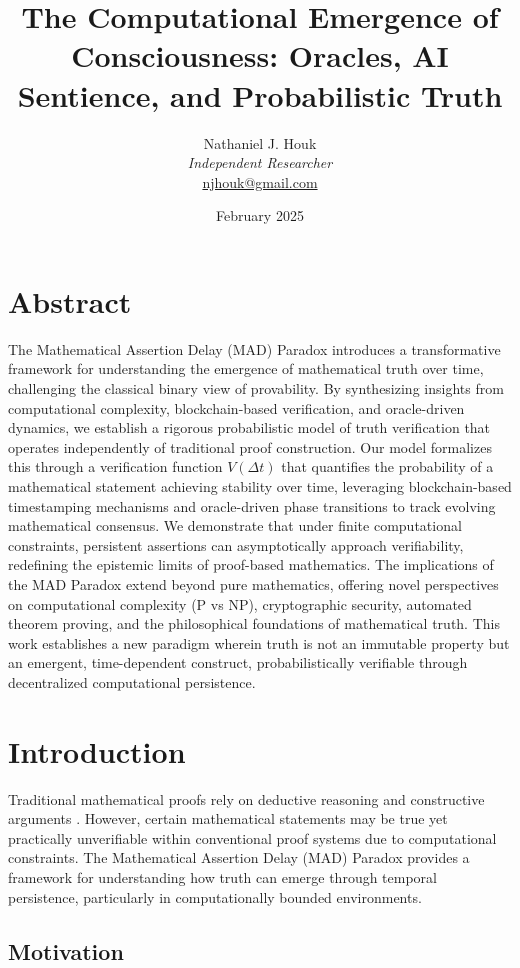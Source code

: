 \documentclass[11pt]{article}
\title{The Computational Emergence of Consciousness: Oracles, AI Sentience, and Probabilistic Truth}
\author{Nathaniel J. Houk\\
\textit{Independent Researcher}\\
\href{mailto:njhouk@gmail.com}{njhouk@gmail.com}}
\date{February 2025}
\begin{document}
\maketitle

\section*{Abstract}

The Mathematical Assertion Delay (MAD) Paradox introduces a transformative framework for understanding the emergence of mathematical truth over time, challenging the classical binary view of provability. By synthesizing insights from computational complexity, blockchain-based verification, and oracle-driven dynamics, we establish a rigorous probabilistic model of truth verification that operates independently of traditional proof construction. Our model formalizes this through a verification function $V(\Delta t)$ that quantifies the probability of a mathematical statement achieving stability over time, leveraging blockchain-based timestamping mechanisms and oracle-driven phase transitions to track evolving mathematical consensus. We demonstrate that under finite computational constraints, persistent assertions can asymptotically approach verifiability, redefining the epistemic limits of proof-based mathematics. The implications of the MAD Paradox extend beyond pure mathematics, offering novel perspectives on computational complexity (P vs NP), cryptographic security, automated theorem proving, and the philosophical foundations of mathematical truth. This work establishes a new paradigm wherein truth is not an immutable property but an emergent, time-dependent construct, probabilistically verifiable through decentralized computational persistence.

\section{Introduction}

Traditional mathematical proofs rely on deductive reasoning and constructive arguments \cite{Cook1971, Godel1931}. However, certain mathematical statements may be true yet practically unverifiable within conventional proof systems due to computational constraints. The Mathematical Assertion Delay (MAD) Paradox provides a framework for understanding how truth can emerge through temporal persistence, particularly in computationally bounded environments.

\subsection{Motivation}
\end{document}
